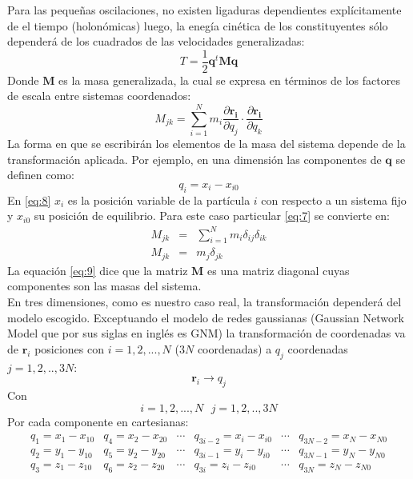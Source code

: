 Para las peque\~{n}as oscilaciones, no existen ligaduras dependientes expl\'{i}citamente de el tiempo (holon\'{o}micas) luego, la eneg\'{i}a cin\'{e}tica de los constituyentes s\'{o}lo depender\'{a} de los cuadrados de las velocidades generalizadas:
\begin{equation}\label{eq:6}
T=\frac{1}{2}\mathbf{q}^t\mathbf{M}\mathbf{q}
\end{equation}
Donde $\mathbf{M}$ es la masa generalizada, la cual se expresa en t\'{e}rminos de los factores de escala entre sistemas coordenados:
\begin{equation}\label{eq:7}
M_{jk}=\sum_{i=1}^{N} m_{i}\frac{\partial \mathbf{r_{i}} }{\partial q_j}\cdot\frac{\partial \mathbf{r_{i}} }{\partial q_k}
\end{equation}
La forma en que se escribir\'{a}n los elementos de la masa del sistema depende de la transformaci\'{o}n aplicada. Por ejemplo, en una dimensi\'{o}n las componentes de $\mathbf{q}$ se definen como:
\begin{equation}\label{eq:8}
q_i=x_i-x_{i0}
\end{equation}
En \eqref{eq:8} $x_i$ es la posici\'{o}n variable de la part\'{i}cula $i$ con respecto a un sistema fijo y $x_{i0}$ su posici\'{o}n de equilibrio. Para este caso particular \eqref{eq:7} se convierte en:
\begin{eqnarray}\label{eq:9}
M_{jk}&=&\sum_{i=1}^{N} m_{i} \delta_{ij}\delta_{ik}\nonumber \\
M_{jk}&=&m_{j} \delta_{jk}
\end{eqnarray}
La equaci\'{o}n \eqref{eq:9} dice que la matriz $\mathbf{M}$ es una matriz diagonal cuyas componentes son las masas del sistema.\\
En tres dimensiones, como es nuestro caso real, la transformaci\'{o}n depender\'{a} del modelo escogido. Exceptuando el modelo de redes gaussianas (Gaussian Network Model que por sus siglas en ingl\'{e}s es GNM) la transformaci\'{o}n de coordenadas va de $\mathbf{r}_{i}$ posiciones con $i=1,2,...,N$ ($3N$ coordenadas) a $q_j$ coordenadas $j=1,2,..,3N$:
\begin{equation*}
\mathbf{r}_{i}\longrightarrow q_{j}
\end{equation*}
Con
\begin{equation*}
i=1,2,...,N\mbox{  }j=1,2,..,3N
\end{equation*}
Por cada componente en cartesianas:
\begin{eqnarray}\label{eq:10}
\begin{array}{cccccc}
q_1=x_1-x_{10}&q_4=x_2-x_{20}&\cdots &q_{3i-2}=x_i-x_{i0}&\cdots &q_{3N-2}=x_N-x_{N0} \\
q_2=y_1-y_{10}&q_5=y_2-y_{20}&\cdots &q_{3i-1}=y_i-y_{i0}&\cdots &q_{3N-1}=y_N-y_{N0}\\
q_3=z_1-z_{10}&q_6=z_2-z_{20}&\cdots &q_{3i}=z_i-z_{i0}&\cdots &q_{3N}=z_N-z_{N0}\\
\end{array}
\end{eqnarray}
